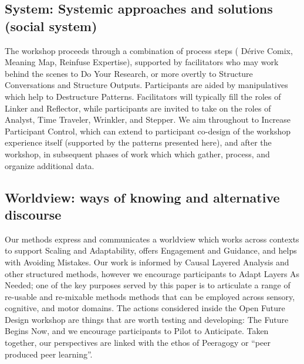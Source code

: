 \documentclass[acmlarge,timestamp]{acmart}
\begin{document}
\subsection{System: Systemic approaches and solutions (social system)}
The workshop proceeds through a combination of process steps ({\sc
  D\'erive Comix}, {\sc Meaning Map}, {\sc Reinfuse Expertise}),
supported by facilitators who may work behind the scenes to {\sc Do
  Your Research}, or more overtly to {\sc Structure Conversations} and
{\sc Structure Outputs}.  Participants are aided by manipulatives
which help to {\sc Destructure Patterns}.  Facilitators will typically
fill the roles of {\sc Linker} and {\sc Reflector}, while participants
are invited to take on the roles of {\sc Analyst}, {\sc Time
  Traveler}, {\sc Wrinkler}, and {\sc Stepper}.  We aim throughout to
{\sc Increase Participant Control}, which can extend to participant
co-design of the workshop experience itself (supported by the patterns
presented here), and after the workshop, in subsequent phases of work
which which gather, process, and organize additional data.

\subsection{Worldview: ways of knowing and alternative discourse}
Our methods express and communicates a worldview which works across
contexts to support {\sc Scaling and Adaptability}, offers {\sc
  Engagement and Guidance}, and helps with {\sc Avoiding Mistakes}.
Our work is informed by Causal Layered Analysis and other structured
methods, however we encourage participants to {\sc Adapt Layers As
  Needed}; one of the key purposes served by this paper is to
articulate a range of re-usable and re-mixable methods methods that
can be employed across sensory, cognitive, and motor domains.  The
actions considered inside the Open Future Design workshop are things
that are worth testing and developing: {\sc The Future Begins Now},
and we encourage participants to {\sc Pilot to Anticipate}.  Taken
together, our perspectives are linked with the ethos of Peeragogy or
“peer produced peer learning”.
\end{document}
